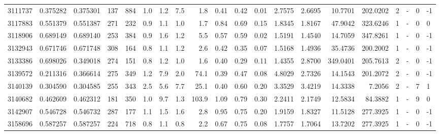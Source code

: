 \begin{tabular}{rrrrrrrrrrrrrrrrrlrl}
   3111737 & 0.375282 &   0.375301 &  137 &  884 &      1.0 &      1.2 &     7.5 &      1.8 &       0.41 &        0.42 &        0.01 &  2.7575 &  2.6695 &   10.7701 &  202.0202 &       2 &             - &        0 &        -1 \\
   3117883 & 0.551379 &   0.551387 &  271 &  232 &      0.9 &      1.1 &     1.0 &      1.7 &       0.84 &        0.69 &        0.15 &  1.8345 &  1.8167 &   47.9042 &  323.6246 &       1 &             - &        0 &         0 \\
   3118906 & 0.689149 &   0.689140 &  253 &  384 &      0.9 &      1.6 &     1.2 &      5.5 &       0.57 &        0.59 &        0.02 &  1.5191 &  1.4540 &   14.7059 &  347.8261 &       1 &             - &        0 &        -1 \\
   3132943 & 0.671746 &   0.671748 &  308 &  164 &      0.8 &      1.1 &     1.2 &      2.6 &       0.42 &        0.35 &        0.07 &  1.5168 &  1.4936 &   35.4736 &  200.2002 &       1 &             - &        0 &        -1 \\
   3133386 & 0.698026 &   0.349018 &  274 &  151 &      0.8 &      1.2 &     1.0 &      1.6 &       0.40 &        0.29 &        0.11 &  1.4355 &  2.8700 &  349.0401 &  205.7613 &       2 &             - &        0 &        -1 \\
   3139572 & 0.211316 &   0.366614 &  275 &  349 &      1.2 &      7.9 &     2.0 &     74.1 &       0.39 &        0.47 &        0.08 &  4.8029 &  2.7326 &   14.1543 &  201.2072 &       2 &             - &        0 &        -1 \\
   3140139 & 0.304590 &   0.304585 &  255 &  343 &      2.5 &      5.6 &     7.7 &     25.1 &       0.40 &        0.60 &        0.20 &  3.3529 &  3.4219 &   14.3338 &    7.2056 &       2 &             - &        7 &         1 \\
   3140682 & 0.462609 &   0.462312 &  181 &  350 &      1.0 &      9.7 &     1.3 &    103.9 &       1.09 &        0.79 &        0.30 &  2.2411 &  2.1749 &   12.5834 &   84.3882 &       1 &             - &        9 &         0 \\
   3142907 & 0.546728 &   0.546732 &  287 &  177 &      1.1 &      1.5 &     1.6 &      2.8 &       0.95 &        0.75 &        0.20 &  1.9159 &  1.8327 &   11.5128 &  277.3925 &       1 &             - &        0 &        -1 \\
   3158696 & 0.587257 &   0.587257 &  224 &  718 &      0.8 &      1.1 &     0.8 &      2.2 &       0.67 &        0.75 &        0.08 &  1.7757 &  1.7064 &   13.7202 &  277.3925 &       1 &             - &        0 &        -1 \\

\end{tabular}
